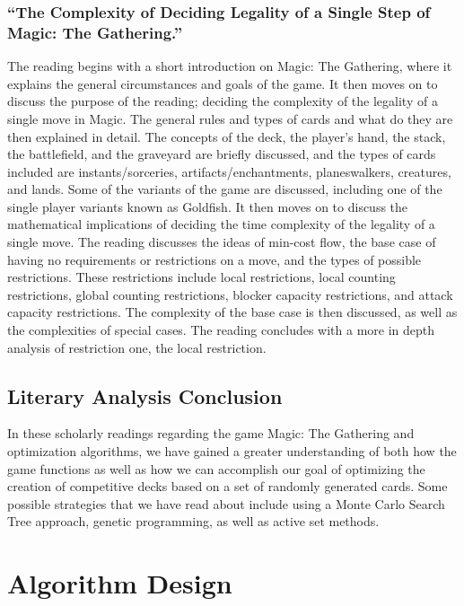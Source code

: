\documentclass[12pt, letterpaper]{article}
\begin{document}
\subsubsection{\enquote{The Complexity of Deciding Legality of a Single Step of Magic: The Gathering.}}

The reading begins with a short introduction on Magic: The Gathering,
where it explains the general circumstances and goals of the game.
It then moves on to discuss the purpose of the reading;
deciding the complexity of the legality of a single move in Magic.
The general rules and types of cards and what do they are then explained in detail.
The concepts of the deck, the player’s hand, the stack, the battlefield,
and the graveyard are briefly discussed, and the types of cards included are instants/sorceries,
artifacts/enchantments, planeswalkers, creatures, and lands.
Some of the variants of the game are discussed,
including one of the single player variants known as Goldfish.
It then moves on to discuss the mathematical implications of
deciding the time complexity of the legality of a single move.
The reading discusses the ideas of min-cost flow,
the base case of having no requirements or restrictions on a move,
and the types of possible restrictions.
These restrictions include local restrictions, local counting restrictions,
global counting restrictions, blocker capacity restrictions, and attack capacity restrictions.
The complexity of the base case is then discussed,
as well as the complexities of special cases.
The reading concludes with a more in depth analysis of restriction one, the local restriction.

\subsection{Literary Analysis Conclusion}

In these scholarly readings regarding the game Magic: The Gathering and optimization algorithms,
we have gained a greater understanding of both how the game functions
as well as how we can accomplish our goal of optimizing the creation of competitive decks
based on a set of randomly generated cards.
Some possible strategies that we have read about include
using a Monte Carlo Search Tree approach, genetic programming, as well as active set methods.

\section{Algorithm Design}
\end{document}
